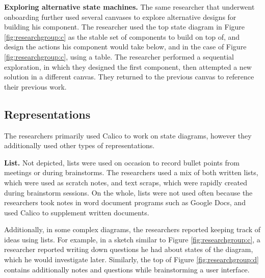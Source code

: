 \textbf{Exploring alternative state machines.} The same researcher that underwent onboarding further used several canvases to explore alternative designs for building his component. The researcher used the top state diagram in Figure \ref{fig:researchgroup:c} as the stable set of components to build on top of, and design the actions his component would take below, and in the case of Figure \ref{fig:researchgroup:c}, using a table. The researcher performed a sequential exploration, in which they designed the first component, then attempted a new solution in a different canvas. They returned to the previous canvas to reference their previous work.




\subsection{Representations}

The researchers primarily used Calico to work on state diagrams, however they additionally used other types of representations.

\textbf{List. }  Not depicted, lists were used on occasion to record bullet points from meetings or during brainstorms. The researchers used a mix of both written lists, which were used as scratch notes, and text scraps, which were rapidly created during brainstorm sessions. On the whole, lists were not used often because the researchers took notes in word document programs such as Google Docs, and used Calico to supplement written documents.

Additionally, in some complex diagrams, the researchers reported keeping track of ideas using lists. For example, in a sketch similar to Figure \ref{fig:researchgroup:c}, a researcher reported writing down questions he had about states of the diagram, which he would investigate later. Similarly, the top of Figure \ref{fig:researchgroup:d} contains additionally notes and questions while brainstorming a user interface.


